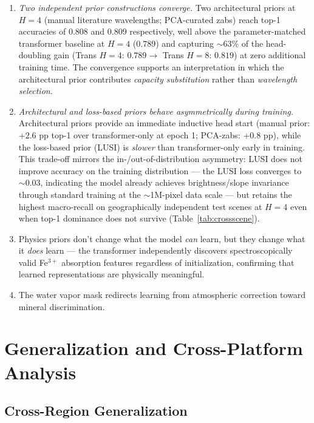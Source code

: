 \documentclass[11pt]{report}
\begin{document}
\begin{enumerate}
  \item \emph{Two independent prior constructions converge.} Two architectural priors at $H=4$ (manual literature wavelengths; PCA-curated zabs) reach top-1 accuracies of $0.808$ and $0.809$ respectively, well above the parameter-matched transformer baseline at $H = 4$ ($0.789$) and capturing $\sim$63\% of the head-doubling gain (Trans $H = 4$: $0.789 \to$ Trans $H = 8$: $0.819$) at zero additional training time. The convergence supports an interpretation in which the architectural prior contributes \emph{capacity substitution} rather than \emph{wavelength selection}.
  \item \emph{Architectural and loss-based priors behave asymmetrically during training.} Architectural priors provide an immediate inductive head start (manual prior: $+2.6$ pp top-1 over transformer-only at epoch 1; PCA-zabs: $+0.8$ pp), while the loss-based prior (LUSI) is \emph{slower} than transformer-only early in training. This trade-off mirrors the in-/out-of-distribution asymmetry: LUSI does not improve accuracy on the training distribution --- the LUSI loss converges to $\sim$0.03, indicating the model already achieves brightness/slope invariance through standard training at the $\sim$1M-pixel data scale --- but retains the highest macro-recall on geographically independent test scenes at $H = 4$ even when top-1 dominance does not survive (Table~\ref{tab:crossscene}).
  \item Physics priors don’t change what the model \emph{can} learn, but they change what it \emph{does} learn --- the transformer independently discovers spectroscopically valid Fe$^{3+}$ absorption features regardless of initialization, confirming that learned representations are physically meaningful.
  \item The water vapor mask redirects learning from atmospheric correction toward mineral discrimination.
\end{enumerate}


\chapter{Generalization and Cross-Platform Analysis}
\label{chap:generalization}

\section{Cross-Region Generalization}
\end{document}
